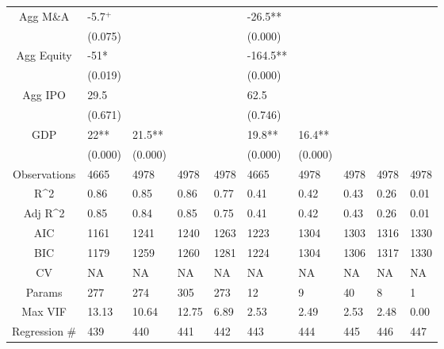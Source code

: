 \documentclass{article}
\begin{document}
\begin{table}[H]
\begin{tabular}{|clllllllll|}
  Agg M\&A & -5.7$^{+}$ &  &  &  & -26.5** &  &  &  &  \\
   & (0.075) &  &  &  & (0.000) &  &  &  &  \\
  Agg Equity & -51* &  &  &  & -164.5** &  &  &  &  \\
   & (0.019) &  &  &  & (0.000) &  &  &  &  \\
  Agg IPO & 29.5 &  &  &  & 62.5 &  &  &  &  \\
   & (0.671) &  &  &  & (0.746) &  &  &  &  \\
  GDP & 22** & 21.5** &  &  & 19.8** & 16.4** &  &  &  \\
   & (0.000) & (0.000) &  &  & (0.000) & (0.000) &  &  &  \\
  \hline
 Observations & 4665 & 4978 & 4978 & 4978 & 4665 & 4978 & 4978 & 4978 & 4978 \\
  R^2 & 0.86 & 0.85 & 0.86 & 0.77 & 0.41 & 0.42 & 0.43 & 0.26 & 0.01 \\
  Adj R^2 & 0.85 & 0.84 & 0.85 & 0.75 & 0.41 & 0.42 & 0.43 & 0.26 & 0.01 \\
  AIC & 1161 & 1241 & 1240 & 1263 & 1223 & 1304 & 1303 & 1316 & 1330 \\
  BIC & 1179 & 1259 & 1260 & 1281 & 1224 & 1304 & 1306 & 1317 & 1330 \\
  CV & NA & NA & NA & NA & NA & NA & NA & NA & NA \\
  Params & 277 & 274 & 305 & 273 & 12 & 9 & 40 & 8 & 1 \\
  Max VIF & 13.13 & 10.64 & 12.75 & 6.89 & 2.53 & 2.49 & 2.53 & 2.48 & 0.00 \\
  Regression \# & 439 & 440 & 441 & 442 & 443 & 444 & 445 & 446 & 447 \\
   \hline
\end{tabular}

\end{table}
\end{document}
